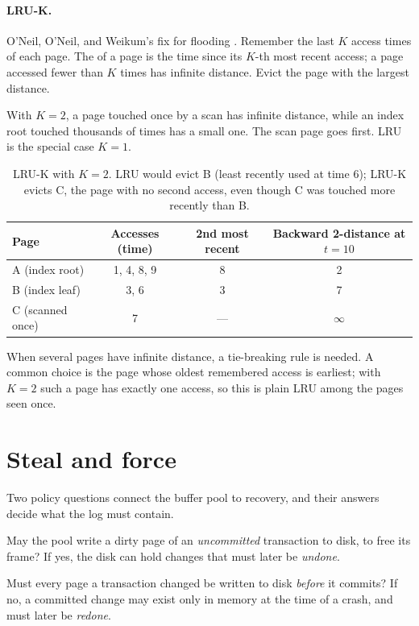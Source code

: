 \paragraph{LRU-K.} O'Neil, O'Neil, and Weikum's fix for flooding \cite{lruk}.
Remember the last $K$ access times of each page. The  of a page is the time since its $K$-th most recent access; a page
accessed fewer than $K$ times has infinite distance. Evict the page with the
largest distance.

With $K=2$, a page touched once by a scan has infinite distance, while an index
root touched thousands of times has a small one. The scan page goes first. LRU
is the special case $K = 1$.

\begin{table}[ht]
\centering
\begin{tabular}{@{}lccc@{}}
\toprule
Page & Accesses (time) & 2nd most recent & Backward 2-distance at $t=10$ \\
\midrule
A (index root) & 1, 4, 8, 9 & 8 & 2 \\
B (index leaf) & 3, 6 & 3 & 7 \\
C (scanned once) & 7 & --- & $\infty$ \\
\bottomrule
\end{tabular}
\caption{LRU-K with $K=2$. LRU would evict B (least recently used at time 6); LRU-K evicts C, the page with no second access, even though C was touched more recently than B.}
\label{tab:lruk}
\end{table}

When several pages have infinite distance, a tie-breaking rule is needed.
A common choice is the page whose oldest remembered access is earliest; with
$K = 2$ such a page has exactly one access, so this is plain LRU among the
pages seen once.

\section{Steal and force}

Two policy questions connect the buffer pool to recovery, and their answers
decide what the log must contain.

\begin{description}[leftmargin=1.2em]
\item[Steal?] May the pool write a dirty page of an \emph{uncommitted} transaction to disk, to free its frame? If yes, the disk can hold changes that must later be \emph{undone}.
\item[Force?] Must every page a transaction changed be written to disk \emph{before} it commits? If no, a committed change may exist only in memory at the time of a crash, and must later be \emph{redone}.
\end{description}

